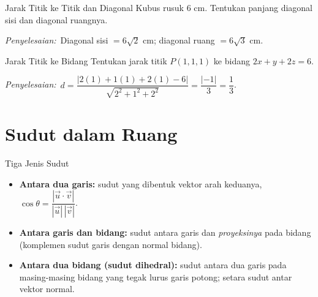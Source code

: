 \documentclass[11pt,a4paper]{report}
\theoremstyle{gaya}
\newcommand{\jawab}{\par\smallskip\noindent\textit{\textcolor{oranye}{Penyelesaian:}}\ }
\begin{document}
\begin{contoh}{Jarak Titik ke Titik dan Diagonal}
Kubus rusuk $6$ cm. Tentukan panjang diagonal sisi dan diagonal ruangnya.

\jawab Diagonal sisi $=6\sqrt2$ cm; diagonal ruang $=6\sqrt3$ cm.
\end{contoh}

\begin{contoh}{Jarak Titik ke Bidang}
Tentukan jarak titik $P(1,1,1)$ ke bidang $2x+y+2z=6$.

\jawab $d=\dfrac{|2(1)+1(1)+2(1)-6|}{\sqrt{2^2+1^2+2^2}}=\dfrac{|-1|}{3}=\dfrac13$.
\end{contoh}

\section{Sudut dalam Ruang}
\begin{konsep}{Tiga Jenis Sudut}
\begin{itemize}[leftmargin=*,topsep=2pt]
  \item \textbf{Antara dua garis:} sudut yang dibentuk vektor arah keduanya, $\cos\theta=\dfrac{|\vec u\cdot\vec v|}{|\vec u|\,|\vec v|}$.
  \item \textbf{Antara garis dan bidang:} sudut antara garis dan \emph{proyeksinya} pada bidang (komplemen sudut garis dengan normal bidang).
  \item \textbf{Antara dua bidang (sudut dihedral):} sudut antara dua garis pada masing-masing bidang yang tegak lurus garis potong; setara sudut antar vektor normal.
\end{itemize}
\end{konsep}
\end{document}
